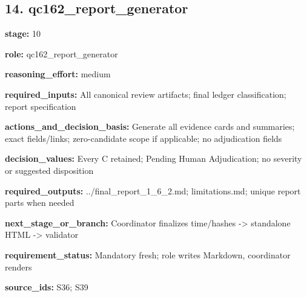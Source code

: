 \documentclass[10pt,a4paper]{article}
\begin{document}
\subsection*{14.\allowbreak{} qc162\_\allowbreak{}report\_\allowbreak{}generator}
\textbf{stage:} 10\par
\textbf{role:} qc162\_\allowbreak{}report\_\allowbreak{}generator\par
\textbf{reasoning\_\allowbreak{}effort:} medium\par
\textbf{required\_\allowbreak{}inputs:} All canonical review artifacts; final ledger classification; report specification\par
\textbf{actions\_\allowbreak{}and\_\allowbreak{}decision\_\allowbreak{}basis:} Generate all evidence cards and summaries; exact fields/\allowbreak{}links; zero-\allowbreak{}candidate scope if applicable; no adjudication fields\par
\textbf{decision\_\allowbreak{}values:} Every C retained; Pending Human Adjudication; no severity or suggested disposition\par
\textbf{required\_\allowbreak{}outputs:} .\allowbreak{}.\allowbreak{}/\allowbreak{}final\_\allowbreak{}report\_\allowbreak{}1\_\allowbreak{}6\_\allowbreak{}2.\allowbreak{}md; limitations.\allowbreak{}md; unique report parts when needed\par
\textbf{next\_\allowbreak{}stage\_\allowbreak{}or\_\allowbreak{}branch:} Coordinator finalizes time/\allowbreak{}hashes -\allowbreak{}> standalone HTML -\allowbreak{}> validator\par
\textbf{requirement\_\allowbreak{}status:} Mandatory fresh; role writes Markdown, coordinator renders\par
\textbf{source\_\allowbreak{}ids:} S36; S39\par
\end{document}
